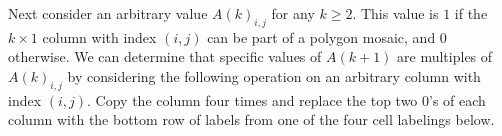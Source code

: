 \documentclass[12pt]{article}
\theoremstyle{plain}
\theoremstyle{definition}
\theoremstyle{remark}
\theoremstyle{definition}
\newcommand{\cell}[4]{ \draw[thick] ( #1 , #2 ) rectangle ( #3 , #4 );}
\newcommand{\lablnode}[3]{\node[shape=circle,draw=none,fill=none, inner sep=0pt,minimum size=5pt] (A) at ( #1 , #2 ) {#3};}
\newcommand{\lablvertex}[3]{\node[shape=circle,draw=none,fill=white, inner sep=2pt,minimum size=5pt] (A) at ( #1 , #2 ) {#3};}
\begin{document}
\begin{center}
\end{center}

Next consider an arbitrary value $A(k)_{i,j}$ for any $k \geq 2$. This value is $1$ if the $k \times 1$ column with index $(i,j)$ can be part of a polygon mosaic, and $0$ otherwise. We can determine that specific values of $A(k+1)$ are multiples of $A(k)_{i,j}$ by considering the following operation on an arbitrary column with index $(i,j)$. Copy the column four times and replace the top two $0$'s of each column with the bottom row of labels from one of the four cell labelings below. 
\end{document}
